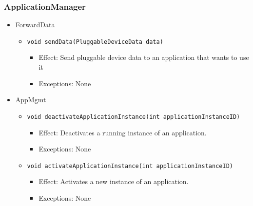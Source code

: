     \subsubsection{ApplicationManager}
        \begin{itemize}
            \item ForwardData
            \begin{itemize}
                \item \texttt{void sendData(PluggableDeviceData data)}
                \begin{itemize}
                    \item Effect: Send pluggable device data to an application that wants to use it
                    \item Exceptions: None
                \end{itemize}
            \end{itemize}

            \item AppMgmt
            \begin{itemize}
                \item \texttt{void deactivateApplicationInstance(int applicationInstanceID)}
                \begin{itemize}
                    \item Effect: Deactivates a running instance of an application.
                    \item Exceptions: None
                \end{itemize}
                \item \texttt{void activateApplicationInstance(int applicationInstanceID)}
                \begin{itemize}
                    \item Effect: Activates a new instance of an application.
                    \item Exceptions: None
                \end{itemize}
            \end{itemize}
        \end{itemize}

